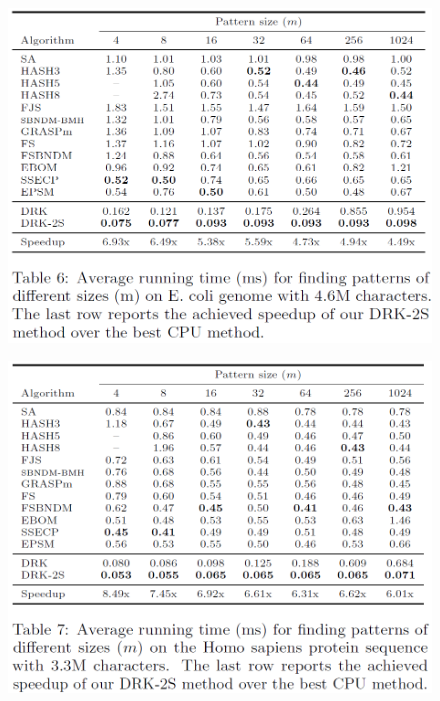 \begin{frame}
	\begin{figure}
		\includegraphics[scale=0.40]{figure/fig-dna.png}
	\end{figure}
\end{frame}

\begin{frame}
	\begin{figure}
		\includegraphics[scale=0.40]{figure/fig-protein.png}
	\end{figure}
\end{frame}

